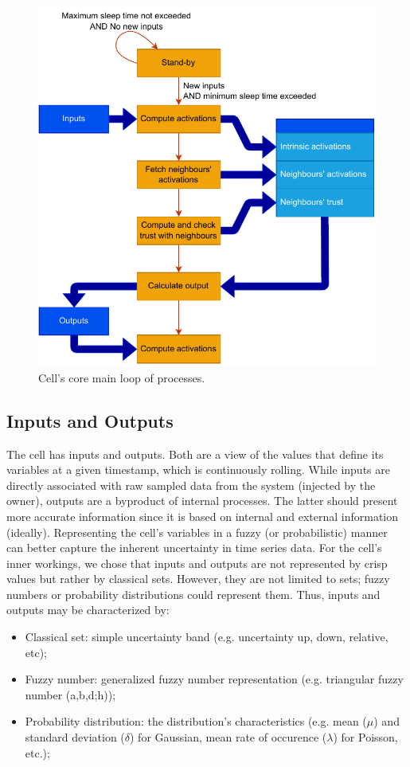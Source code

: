 \begin{figure}[h!]
    \centering
    \includegraphics[width=12cm]{figures/chapter4/cell/processes.pdf}
    \caption{Cell's core main loop of processes.}
    \label{fig:cellprocesses}
\end{figure}

\subsection{Inputs and Outputs}

The cell has inputs and outputs. Both are a view of the values that define its variables at a given timestamp, which is continuously rolling. While inputs are directly associated with raw sampled data from the system (injected by the owner), outputs are a byproduct of internal processes. The latter should present more accurate information since it is based on internal and external information (ideally).
Representing the cell's variables in a fuzzy (or probabilistic) manner can better capture the inherent uncertainty in time series data. For the cell's inner workings, we chose that inputs and outputs are not represented by crisp values but rather by classical sets. However, they are not limited to sets; fuzzy numbers or probability distributions could represent them. Thus, inputs and outputs may be characterized by:

\begin{itemize}
    \item Classical set: simple uncertainty band (e.g. uncertainty up, down, relative, etc);
    \item Fuzzy number: generalized fuzzy number representation \cite{Zhang2019} (e.g. triangular fuzzy number (a,b,d;h));
    \item Probability distribution: the distribution's characteristics (e.g. mean ($\mu$) and standard deviation ($\delta$) for Gaussian, mean rate of occurence ($\lambda$) for Poisson, etc.);
\end{itemize}

